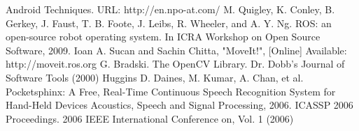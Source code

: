 \documentclass[letterpaper, 10 pt, conference]{ieeeconf}  %
\begin{document}








\begin{thebibliography}{99}

 Android Techniques. URL: http://en.npo-at.com/
 M. Quigley, K. Conley, B. Gerkey, J. Faust, T. B. Foote, J. Leibs, R. Wheeler, and A. Y. Ng. ROS: an open-source robot operating system. In ICRA Workshop on Open Source Software, 2009.
 Ioan A. Sucan and Sachin Chitta, "MoveIt!", [Online] Available: http://moveit.ros.org
 G. Bradski. The OpenCV Library. Dr. Dobb’s Journal of Software
Tools (2000) 
 Huggins D. Daines, M. Kumar, A. Chan, et al. Pocketsphinx: A Free,
Real-Time Continuous Speech Recognition System for Hand-Held Devices Acoustics, Speech and Signal Processing, 2006. ICASSP 2006 Proceedings. 2006 IEEE International Conference on, Vol. 1 (2006)


\end{thebibliography}
\end{document}
